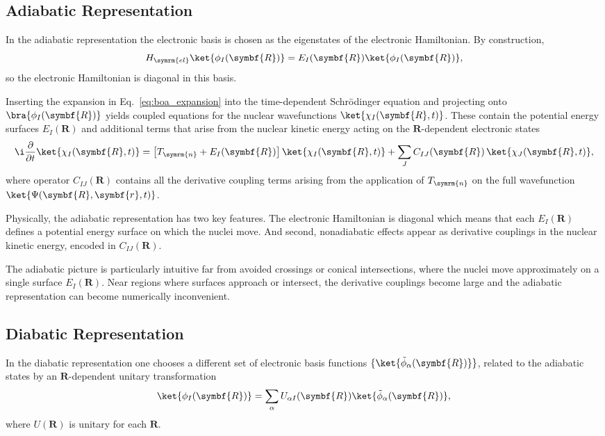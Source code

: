 \subsection{Adiabatic Representation}\label{sec:adiabatic_representation}
In the adiabatic representation the electronic basis is chosen as the eigenstates of the electronic Hamiltonian. By construction,
\begin{equation}
H_{\symrm{el}}\ket{\phi_I(\symbf{R})}=E_I(\symbf{R})\ket{\phi_I(\symbf{R})},
\end{equation}
so the electronic Hamiltonian is diagonal in this basis.

Inserting the expansion in Eq.~\eqref{eq:boa_expansion} into the time-dependent Schr\"odinger equation and projecting onto $\bra{\phi_I(\symbf{R})}$ yields coupled equations for the nuclear wavefunctions $\ket{\chi_I(\symbf{R},t)}$. These contain the potential energy surfaces $E_I(\symbf{R})$ and additional terms that arise from the nuclear kinetic energy acting on the $\symbf{R}$-dependent electronic states
\begin{equation}
\i\frac{\partial}{\partial{t}}\ket{\chi_I(\symbf{R},t)}=\left[T_{\symrm{n}}+E_I(\symbf{R})\right]\ket{\chi_I(\symbf{R},t)}+\sum_JC_{IJ}(\symbf{R})\,\ket{\chi_J(\symbf{R},t)},
\end{equation}
where operator $C_{IJ}(\symbf{R})$ contains all the derivative coupling terms arising from the application of $T_{\symrm{n}}$ on the full wavefunction $\ket{\Psi(\symbf{R},\symbf{r},t)}$.

Physically, the adiabatic representation has two key features. The electronic Hamiltonian is diagonal which means that each $E_I(\symbf{R})$ defines a potential energy surface on which the nuclei move. And second, nonadiabatic effects appear as derivative couplings in the nuclear kinetic energy, encoded in $C_{IJ}(\symbf{R})$.

The adiabatic picture is particularly intuitive far from avoided crossings or conical intersections, where the nuclei move approximately on a single surface $E_I(\symbf{R})$. Near regions where surfaces approach or intersect, the derivative couplings become large and the adiabatic representation can become numerically inconvenient.
\subsection{Diabatic Representation}\label{sec:diabatic_representation}
In the diabatic representation one chooses a different set of electronic basis functions $\{\ket{\tilde\phi_\alpha(\symbf{R})}\}$, related to the adiabatic states by an $\symbf{R}$-dependent unitary transformation
\begin{equation}\label{eq:unitary_transform}
\ket{\phi_I(\symbf{R})}=\sum_\alpha U_{\alpha I}(\symbf{R})\ket{\tilde\phi_\alpha(\symbf{R})},
\end{equation}
where $U(\symbf{R})$ is unitary for each $\symbf{R}$.

